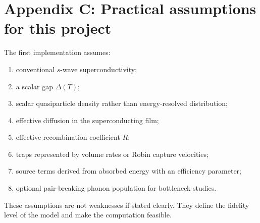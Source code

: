 \documentclass[11pt]{article}
\begin{document}
\section{Appendix C: Practical assumptions for this project}
The first implementation assumes:
\begin{enumerate}[leftmargin=1.6em]
    \item conventional $s$-wave superconductivity;
    \item a scalar gap $\Delta(T)$;
    \item scalar quasiparticle density rather than energy-resolved distribution;
    \item effective diffusion in the superconducting film;
    \item effective recombination coefficient $R$;
    \item traps represented by volume rates or Robin capture velocities;
    \item source terms derived from absorbed energy with an efficiency parameter;
    \item optional pair-breaking phonon population for bottleneck studies.
\end{enumerate}
These assumptions are not weaknesses if stated clearly. They define the fidelity level of the model and make the computation feasible.
\end{document}
